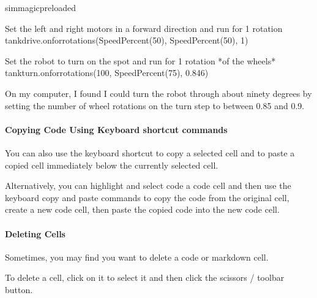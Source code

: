 \documentclass[letterpaper,10pt,english]{sphinxmanual}
\begin{document}
{
\begin{sphinxVerbatim}[commandchars=\\\{\}]
\llap{\color{nbsphinxin}[ ]:\,\hspace{\fboxrule}\hspace{\fboxsep}}\PYGZpc{}\PYGZpc{}sim\PYGZus{}magic\PYGZus{}preloaded

\PYGZsh{} Set the left and right motors in a forward direction
\PYGZsh{} and run for 1 rotation
tank\PYGZus{}drive.on\PYGZus{}for\PYGZus{}rotations(SpeedPercent(50), SpeedPercent(50), 1)


\PYGZsh{} Set the robot to turn on the spot
\PYGZsh{} and run for 1 rotation *of the wheels*
tank\PYGZus{}turn.on\PYGZus{}for\PYGZus{}rotations(\PYGZhy{}100, SpeedPercent(75), 0.846)

\end{sphinxVerbatim}
}

On my computer, I found I could turn the robot through about ninety degrees by setting the number of wheel rotations on the turn step to between 0.85 and 0.9.


\paragraph{Copying Code Using Keyboard shortcut commands}
\label{\detokenize{content/01_Robot_Lab/Section_00_01:Copying-Code-Using-Keyboard-shortcut-commands}}
You can also use the  keyboard shortcut to copy a selected cell and  to paste a copied cell immediately below the currently selected cell.

Alternatively, you can highlight and select code  a code cell and then use the keyboard copy and paste commands to copy the code from the original cell, create a new code cell, then paste the copied code into the new code cell.


\paragraph{Deleting Cells}
\label{\detokenize{content/01_Robot_Lab/Section_00_01:Deleting-Cells}}
Sometimes, you may find you want to delete a code or markdown cell.

To delete a cell, click on it to select it and then click the scissors /  toolbar button.
\end{document}
